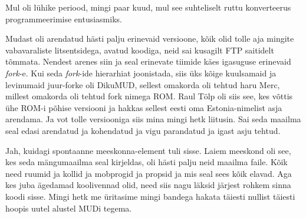 
Mul oli lühike periood, mingi paar kuud, mul see suhteliselt ruttu konverteerus programmeerimise entusiasmiks. 


Mudast oli arendatud hästi palju erinevaid versioone, kõik olid tolle aja mingite vabavaraliste litsentsidega, avatud koodiga, neid sai kusagilt FTP saitidelt tõmmata. Nendest arenes siin ja seal erinevate tiimide käes igasuguse erinevaid \emph{fork}-e. Kui seda \emph{fork}-ide hierarhiat joonistada, siis üks kõige kuulsamaid ja levinumaid juur-forke oli DikuMUD, sellest omakorda oli tehtud haru Merc, millest omakorda oli tehtud fork nimega ROM. Raul Tölp oli siis see, kes võttis ühe ROM-i põhise  versiooni ja hakkas sellest eesti oma  Estonia-nimelist asja arendama. Ja vot tolle versiooniga siis mina mingi hetk liitusin. Sai seda maailma seal edasi arendatud ja kohendatud ja vigu parandatud ja igast asju tehtud. 


Jah, kuidagi spontaanne meeskonna-element tuli sisse. Laiem meeskond oli see, kes seda mängumaailma seal kirjeldas, oli hästi palju neid maailma faile. Kõik need ruumid ja kollid ja mobprogid ja propsid ja mis seal sees kõik elavad. Aga kes juba ägedamad koolivennad olid, need siis nagu läksid  järjest rohkem sinna koodi sisse. Mingi hetk me üritasime mingi bandega  hakata täiesti nullist täiesti hoopis uutel alustel MUDi tegema. 

